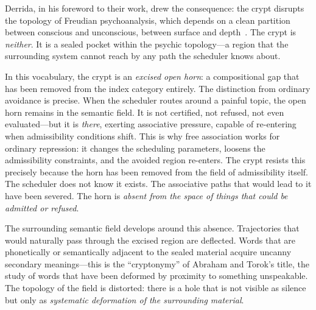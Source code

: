 Derrida, in his foreword to their work, drew the consequence: the crypt disrupts the topology of Freudian psychoanalysis, which depends on a clean partition between conscious and unconscious, between surface and depth~\cite{derrida1986}. The crypt is \emph{neither}. It is a sealed pocket within the psychic topology---a region that the surrounding system cannot reach by any path the scheduler knows about.

In this vocabulary, the crypt is an \emph{excised open horn}: a compositional gap that has been removed from the index category entirely. The distinction from ordinary avoidance is precise. When the scheduler routes around a painful topic, the open horn remains in the semantic field. It is not certified, not refused, not even evaluated---but it is \emph{there}, exerting associative pressure, capable of re-entering when admissibility conditions shift. This is why free association works for ordinary repression: it changes the scheduling parameters, loosens the admissibility constraints, and the avoided region re-enters. The crypt resists this precisely because the horn has been removed from the field of admissibility itself. The scheduler does not know it exists. The associative paths that would lead to it have been severed. The horn is \emph{absent from the space of things that could be admitted or refused}.

The surrounding semantic field develops around this absence. Trajectories that would naturally pass through the excised region are deflected. Words that are phonetically or semantically adjacent to the sealed material acquire uncanny secondary meanings---this is the ``cryptonymy'' of Abraham and Torok's title, the study of words that have been deformed by proximity to something unspeakable. The topology of the field is distorted: there is a hole that is not visible as silence but only as \emph{systematic deformation of the surrounding material}.

